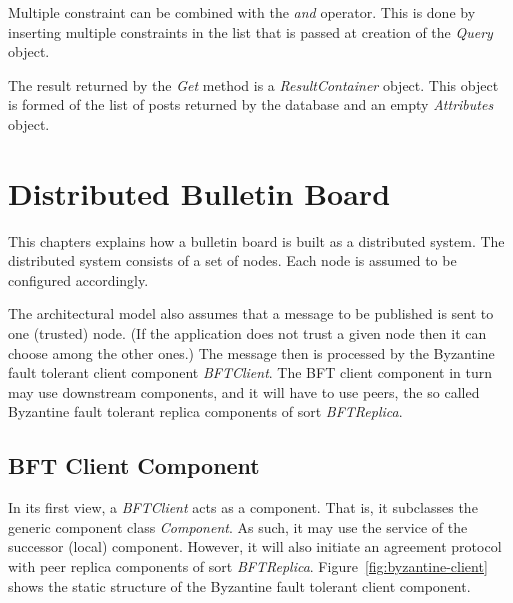 \documentclass[oneside]{scrreprt}
\newcommand{\fig}[1]{Figure~\ref{#1}}
\begin{document}
Multiple constraint can be combined with the \emph{and} operator. This is done by inserting multiple constraints in the list that is passed at creation of the \emph{Query} object.

The result returned by the \emph{Get} method is a \emph{ResultContainer} object. This object is formed of the list of posts returned by the database and an empty \emph{Attributes} object.
 

\chapter{Distributed Bulletin Board}

This chapters explains how a bulletin board is built as
a distributed system. The distributed system consists of
a set of nodes. Each node is assumed to be configured
accordingly.

The architectural model also assumes that a message to
be published is sent to one (trusted) node. (If the
application does not trust a given node then it can
choose among the other ones.) The message then is
processed by the Byzantine fault tolerant client
component \emph{BFTClient}. The BFT client component in turn
may use downstream components, and it will have
to use peers, the so called Byzantine fault tolerant
replica components of sort \emph{BFTReplica}.


\section{BFT Client Component}

In its first view, a \emph{BFTClient} acts as a component.
That is, it subclasses the generic component class
\emph{Component}. As such, it may use the service of
the successor (local) component. However, it will also
initiate an agreement protocol with peer replica
components of sort \emph{BFTReplica}. \fig{fig:byzantine-client}
shows the static structure of the Byzantine fault tolerant client
component.
\end{document}
